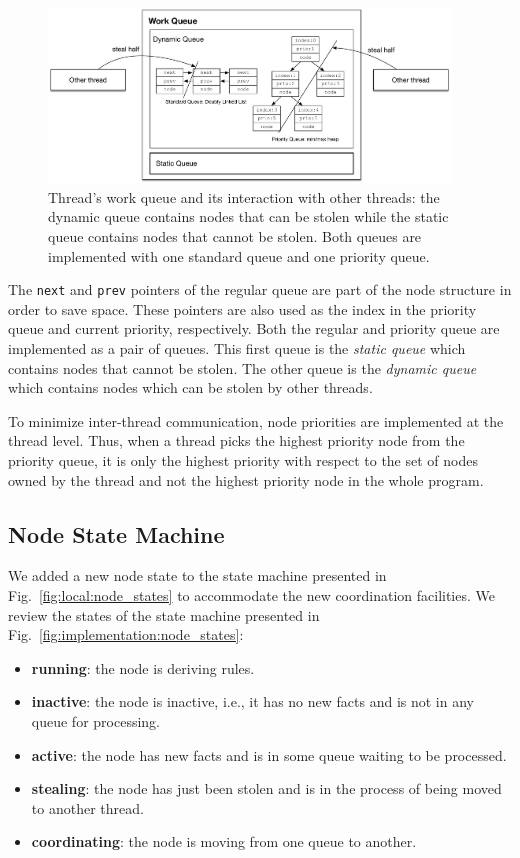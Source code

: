 \begin{figure}[t]
\centering
\includegraphics[width=0.95\textwidth]{figures/implementation/work_queue.pdf}
\caption{Thread's work queue and its interaction with other threads: the dynamic queue contains nodes that can be
   stolen while the static queue contains nodes that cannot be stolen. Both
   queues are implemented with one standard queue and one priority queue.}
\label{fig:implementation:work_queue}
\end{figure}

The \texttt{next} and \texttt{prev} pointers of the regular queue are part of
the node structure in order to save space. These pointers are also used as the
index in the priority queue and current priority, respectively. Both the regular
and priority queue are implemented as a pair of queues.  This first queue is the
\emph{static queue} which contains nodes that cannot be stolen.  The other queue
is the \emph{dynamic queue} which contains nodes which can be stolen by other
threads.

To minimize inter-thread communication, node priorities are implemented at the
thread level. Thus, when a thread picks the highest priority node from the
priority queue, it is only the highest priority with respect to the set of nodes
owned by the thread and not the highest priority node in the whole program.  

\subsection{Node State Machine}\label{sec:node_state_machine}

We added a new node state to the state machine presented in
Fig.~\ref{fig:local:node_states} to accommodate the new coordination facilities.
We review the states of the state machine presented in
Fig.~\ref{fig:implementation:node_states}:

\begin{itemize}
   \item \textbf{running}: the node is deriving rules.
   \item \textbf{inactive}: the node is inactive, i.e., it has no new facts and is not in any
   queue for processing.
   \item \textbf{active}: the node has new facts and is in some queue waiting
   to be processed.
   \item \textbf{stealing}: the node has just been stolen and is in the process of being
   moved to another thread.
   \item \textbf{coordinating}: the node is moving from one queue to another.
\end{itemize}

